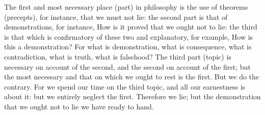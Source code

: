 The first and most necessary place (part)  in philosophy is the use of theorems
(precepts), for  instance, that  we must not  lie: the second  part is  that of
demonstrations, for instance,  How is it proved  that we ought not  to lie: the
third is that which is confirmatory  of these two and explanatory, for example,
How is  this a demonstration? For  what is demonstration, what  is consequence,
what is contradiction, what is truth, what is falsehood? The third part (topic)
is necessary on account of the second,  and the second on account of the first;
but the most necessary and that on which  we ought to rest is the first. But we
do  the contrary.  For  we spend  our  time on  the third  topic,  and all  our
earnestness is about  it: but we entirely neglect the  first. Therefore we lie;
but the demonstration that we ought not to lie we have ready to hand.
